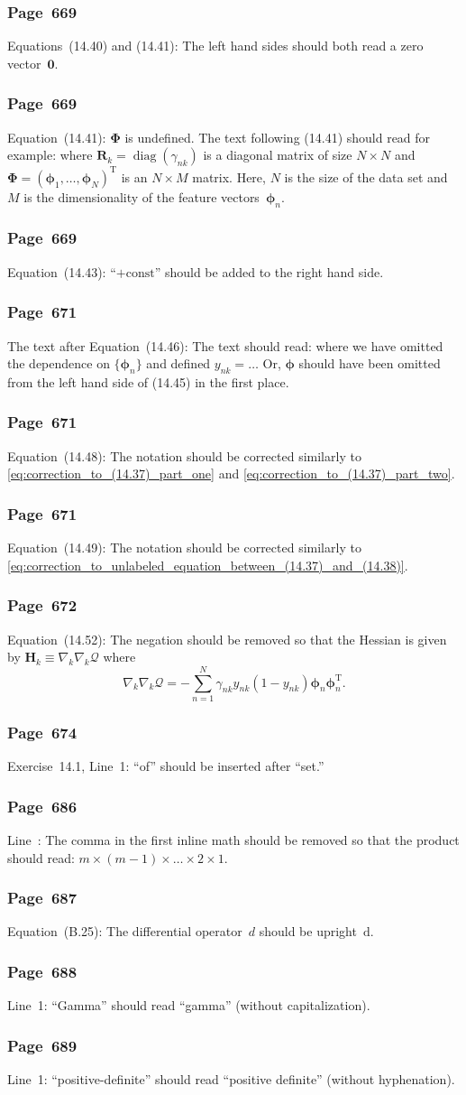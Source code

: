 \documentclass[12pt,a4paper]{article}
\newcommand{\erratum}[1]{\subsubsection*{#1}}
\begin{document}
\erratum{Page~669}
Equations~(14.40) and (14.41): The left hand sides should both read a zero vector~$\mathbf{0}$.

\erratum{Page~669}
Equation~(14.41): $\bm{\Phi}$ is undefined.
The text following (14.41) should read for example:
where $\mathbf{R}_k = \operatorname{diag}(\gamma_{nk})$ is
a diagonal matrix of size $N \times N$ and
$\bm{\Phi} = \left( \bm{\phi}_1, \dots, \bm{\phi}_N \right)^{\operatorname{T}}$ is
an $N \times M$ matrix.
Here, $N$ is the size of the data set and
$M$ is the dimensionality of the feature vectors~$\bm{\phi}_n$.

\erratum{Page~669}
Equation~(14.43): ``$+\text{const}$'' should be added to the right hand side.

\erratum{Page~671}
The text after Equation~(14.46):
The text should read: where we have omitted the dependence on $\{\bm{\phi}_n\}$ and
defined $y_{nk} = \dots$
Or, $\bm{\phi}$ should have been omitted from the left hand side of (14.45) in the first place.

\erratum{Page~671}
Equation~(14.48):
The notation should be corrected similarly to
\eqref{eq:correction_to_(14.37)_part_one} and
\eqref{eq:correction_to_(14.37)_part_two}.

\erratum{Page~671}
Equation~(14.49):
The notation should be corrected similarly to
\eqref{eq:correction_to_unlabeled_equation_between_(14.37)_and_(14.38)}.

\erratum{Page~672}
Equation~(14.52):
The negation should be removed so that the Hessian is given by
$\mathbf{H}_k \equiv \nabla_k \nabla_k \mathcal{Q}$ where
\begin{equation}
\nabla_k \nabla_k \mathcal{Q}
   = - \sum_{n=1}^{N} \gamma_{nk} y_{nk} (1 - y_{nk}) \bm{\phi}_n \bm{\phi}_n^{\operatorname{T}}.
\end{equation}

\erratum{Page~674}
Exercise~14.1, Line~1:
``of'' should be inserted after ``set.''

\erratum{Page~686}
Line~:
The comma in the first inline math should be removed so that the product should read:
$m \times (m-1) \times \dots \times 2 \times 1$.

\erratum{Page~687}
Equation~(B.25):
The differential operator~$d$ should be upright~$\mathrm{d}$.

\erratum{Page~688}
Line~1:
``Gamma'' should read ``gamma'' (without capitalization).

\erratum{Page~689}
Line~1: ``positive-definite'' should read ``positive definite'' (without hyphenation).
\end{document}
